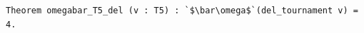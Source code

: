 \begin{lstlisting}[language=Rocq]
Theorem omegabar_T5_del (v : T5) : `$\bar\omega$`(del_tournament v) = 4.
\end{lstlisting}
